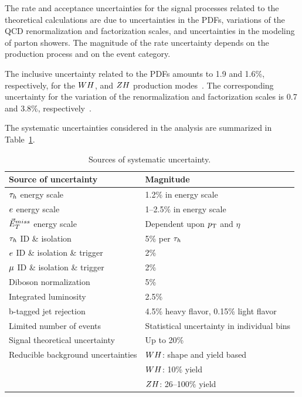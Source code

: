 The rate and acceptance uncertainties for the signal processes related to the 
theoretical calculations are due to uncertainties in the PDFs, variations of 
the QCD renormalization and factorization scales, and uncertainties in the 
modeling of parton showers. The magnitude of the rate uncertainty depends on 
the production process and on the event category.

The inclusive uncertainty related to the PDFs amounts to 1.9 and 1.6\%, 
respectively, for the $WH$, and $ZH$ production modes~\cite{deFlorian:2016spz}. The
corresponding uncertainty for the variation of the renormalization and 
factorization scales is 0.7 and 3.8\%, respectively~\cite{deFlorian:2016spz}.



The systematic uncertainties considered in the analysis are summarized in Table~\ref{tab:vh_uncertainties}.

\begin{table}[!ht]
\centering
{}
\begin{tabular}{ll}
Source of uncertainty & Magnitude \\
\hline
 $\tau_{h}$ energy scale                & 1.2\% in energy scale\\
 $e$ energy scale               & 1--2.5\%  in energy scale \\
 $\vec{E}^{miss}_T$ energy scale              & Dependent upon $p_\mathrm{T}$ and $\eta$ \\
 $\tau_{h}$ ID \& isolation & 5\% per $\tau_{h}$  \\
 $e$ ID \& isolation \& trigger  &   2\%  \\
 $\mu$ ID \& isolation \& trigger & 2\%  \\
 Diboson normalization & 5\% \\
 Integrated luminosity     & 2.5\%  \\
 b-tagged jet rejection & 4.5\% heavy flavor, 0.15\% light flavor \\
 Limited number of events                & Statistical uncertainty in individual bins  \\
 Signal theoretical uncertainty  & Up to 20\% \\
 Reducible background uncertainties & $WH$: shape and yield based \\
                                    & $WH$: 10\% yield \\
                                    & $ZH$: 26--100\% yield \\
\hline
\end{tabular}
\caption{Sources of systematic uncertainty.}
\label{tab:vh_uncertainties}
\end{table}



